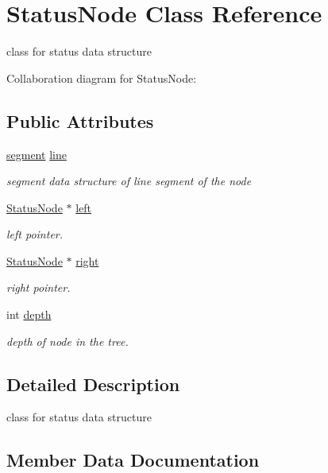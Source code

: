 \hypertarget{class_status_node}{}\section{Status\+Node Class Reference}
\label{class_status_node}


class for status data structure  




Collaboration diagram for Status\+Node\+:
\subsection*{Public Attributes}
\begin{DoxyCompactItemize}
\item 
\hyperlink{structsegment}{segment} \hyperlink{class_status_node_a94811b906bb52ab079fd6d85f4f04a00}{line}
\begin{DoxyCompactList}\small\item\em segment data structure of line segment of the node \end{DoxyCompactList}\item 
\hyperlink{class_status_node}{Status\+Node} $\ast$ \hyperlink{class_status_node_a4d0bbda2f104426a1ec804beb5a1504e}{left}
\begin{DoxyCompactList}\small\item\em left pointer. \end{DoxyCompactList}\item 
\hyperlink{class_status_node}{Status\+Node} $\ast$ \hyperlink{class_status_node_a32820acf8d0d267b06024e0b5bec52b8}{right}
\begin{DoxyCompactList}\small\item\em right pointer. \end{DoxyCompactList}\item 
int \hyperlink{class_status_node_a4ba6f8b53d9df66293583a00fd6e35d0}{depth}
\begin{DoxyCompactList}\small\item\em depth of node in the tree. \end{DoxyCompactList}\end{DoxyCompactItemize}


\subsection{Detailed Description}
class for status data structure 

\subsection{Member Data Documentation}
\mbox{\label{class_status_node_a4ba6f8b53d9df66293583a00fd6e35d0}} 
